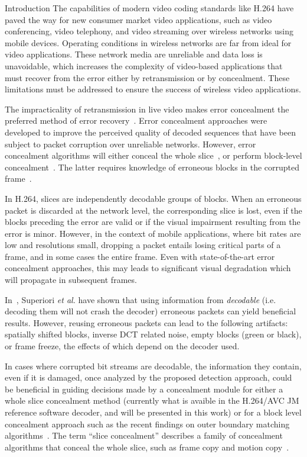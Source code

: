 \documentclass{article}
\newcommand{\ltCodec}{H.264/AVC JM reference software}
\begin{document}
\begin{section}{Introduction}
\label{section-introduction}
The capabilities of modern video coding standards like H.264 have paved the
way for new consumer market video applications, such as video conferencing,
video telephony, and video streaming over wireless networks using mobile
devices. Operating conditions in wireless networks are far from ideal for
video applications. These network media are unreliable and data loss is
unavoidable, which increases the complexity of video-based applications
that must recover from the error either by retransmission or by
concealment. These limitations must be addressed to ensure the success of
wireless video applications.

The impracticality of retransmission in live video makes error
concealment the preferred method of error recovery~\cite{Wang1998}. Error
concealment approaches were developed to improve the perceived quality of
decoded sequences that have been subject to packet corruption over
unreliable networks. However, error concealment algorithms will either
conceal the whole slice~\cite{Wu-ISCAS-2006}, or perform block-level
concealment~\cite{OBMA}. The latter requires knowledge of erroneous blocks
in the corrupted frame~\cite{Wang1998}.

In H.264, slices are independently decodable groups of blocks. When an erroneous
packet is discarded at the network level, the corresponding slice is lost, even
if the blocks preceding the error are valid or if the visual impairment
resulting from the error is minor. However, in the context of mobile
applications, where bit rates are low and resolutions small, dropping a packet
entails losing critical parts of a frame, and in some cases the entire frame.
Even with state-of-the-art error concealment approaches, this may leads to 
significant visual degradation which will propagate in subsequent frames.

In~\cite{Superiori2007}, Superiori \textit{et al.} have shown that using
information from \emph{decodable} (i.e. decoding them will not crash the 
decoder)
erroneous packets can yield beneficial results.
However, reusing erroneous packets can lead to the following artifacts:
spatially shifted blocks, inverse DCT related noise, empty blocks (green or
black), or frame freeze, the effects of which depend on the decoder used.

In cases where corrupted bit streams are decodable, the information they
contain, even if it is damaged, once analyzed by the proposed detection 
approach,
could be beneficial in guiding decisions made by a concealment module for 
either 
a whole slice concealment method (currently what is avaible in the \ltCodec{} 
decoder, 
and will be presented in this work) or for a block level concealment approach 
such as the recent findings on outer boundary matching algorithms~\cite{OBMA}.
The term ``slice concealment'' describes a family of concealment algorithms 
that conceal the whole slice, such as frame copy and motion 
copy~\cite{Wu-ISCAS-2006}.


\end{section}
\end{document}
